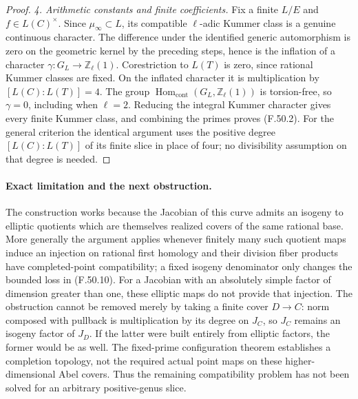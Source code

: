 \documentclass[11pt]{article}
\begin{document}
\begin{proof}
\emph{4. Arithmetic constants and finite coefficients.}
Fix a finite \(L/E\) and \(f\in L(C)^\times\).
Since \(\mu_\infty\subset L\), its compatible
\(\ell\)-adic Kummer class is a genuine continuous
character. The difference under the identified
generic automorphism is zero on the geometric
kernel by the preceding steps, hence is the
inflation of a character
\(\gamma:G_L\to\mathbb Z_\ell(1)\).
Corestriction to \(L(T)\) is zero, since rational
Kummer classes are fixed. On the inflated character
it is multiplication by \([L(C):L(T)]=4\).
The group \(\operatorname{Hom}_{\mathrm{cont}}
(G_L,\mathbb Z_\ell(1))\) is torsion-free, so
\(\gamma=0\), including when \(\ell=2\).
Reducing the integral Kummer character gives every
finite Kummer class, and combining the primes
proves (F.50.2).
For the general criterion the identical argument uses
the positive degree \([L(C):L(T)]\) of its finite
slice in place of four; no divisibility assumption
on that degree is needed.
\end{proof}

\paragraph{Exact limitation and the next obstruction.}
The construction works because the Jacobian of this
curve admits an isogeny to elliptic quotients which
are themselves realized covers of the same rational
base. More generally the argument applies whenever
finitely many such quotient maps induce an injection
on rational first homology and their division
fiber products have completed-point compatibility;
a fixed isogeny denominator only changes the bounded
loss in (F.50.10). For a Jacobian with an absolutely
simple factor of dimension greater than one, these
elliptic maps do not provide that injection. The
obstruction cannot be removed merely by taking a
finite cover \(D\to C\): norm composed with
pullback is multiplication by its degree on
\(J_C\), so \(J_C\) remains an isogeny factor
of \(J_D\). If the latter were built entirely
from elliptic factors, the former would be as well.
The
fixed-prime configuration theorem establishes a
completion topology, not the required actual point
maps on these higher-dimensional Abel covers.
Thus the remaining compatibility problem has not
been solved for an arbitrary positive-genus slice.



\end{document}
